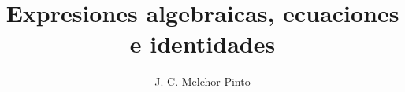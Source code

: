 \documentclass[12pt]{guia}
\title{Expresiones algebraicas, ecuaciones e identidades}
\author{J. C. Melchor Pinto}
\begin{document}
\pagestyle{headandfoot}
\addpoints
\INFO
\printanswers
\vspace{-0.5cm}
\begin{multicols}{2}
    
    \columnbreak
    
    
    
\end{multicols}

\begin{questions}
    \questionboxed[10]{}
    \questionboxed[10]{}
    \questionboxed[10]{}
    \questionboxed[10]{}
    \questionboxed[10]{}
    \questionboxed[10]{}
    \questionboxed[10]{}
    \questionboxed[10]{}
    \questionboxed[10]{}
    \questionboxed[10]{}
\end{questions}
\end{document}
